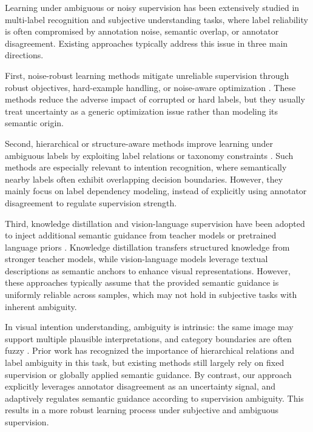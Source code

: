 Learning under ambiguous or noisy supervision has been extensively studied in multi-label recognition and subjective understanding tasks, where label reliability is often compromised by annotation noise, semantic overlap, or annotator disagreement. 
Existing approaches typically address this issue in three main directions.

First, noise-robust learning methods mitigate unreliable supervision through robust objectives, hard-example handling, or noise-aware optimization \cite{lin_focal_2020, shrivastava_training_2016, ye_collaborative_2022, ridnik_asymmetric_2021}. 
These methods reduce the adverse impact of corrupted or hard labels, but they usually treat uncertainty as a generic optimization issue rather than modeling its semantic origin.

Second, hierarchical or structure-aware methods improve learning under ambiguous labels by exploiting label relations or taxonomy constraints \cite{zhang_use_2022, shi_learnable_2023}. 
Such methods are especially relevant to intention recognition, where semantically nearby labels often exhibit overlapping decision boundaries. 
However, they mainly focus on label dependency modeling, instead of explicitly using annotator disagreement to regulate supervision strength.

Third, knowledge distillation and vision-language supervision have been adopted to inject additional semantic guidance from teacher models or pretrained language priors \cite{touvron_training_2021, radford_learning_2021}. 
Knowledge distillation transfers structured knowledge from stronger teacher models, while vision-language models leverage textual descriptions as semantic anchors to enhance visual representations. 
However, these approaches typically assume that the provided semantic guidance is uniformly reliable across samples, which may not hold in subjective tasks with inherent ambiguity.

In visual intention understanding, ambiguity is intrinsic: the same image may support multiple plausible interpretations, and category boundaries are often fuzzy \cite{jia_intentonomy_2021, shi_learnable_2023}. 
Prior work has recognized the importance of hierarchical relations and label ambiguity in this task, but existing methods still largely rely on fixed supervision or globally applied semantic guidance. 
By contrast, our approach explicitly leverages annotator disagreement as an uncertainty signal, and adaptively regulates semantic guidance according to supervision ambiguity. 
This results in a more robust learning process under subjective and ambiguous supervision.